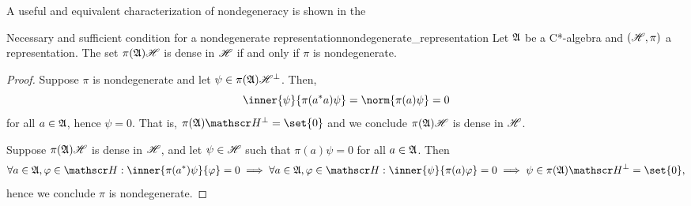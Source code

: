 A useful and equivalent characterization of nondegeneracy is shown in the
\begin{lemma}{Necessary and sufficient condition for a nondegenerate representation}{nondegenerate_representation}
    Let \(\mathfrak{A}\) be a C*-algebra and \((\mathscr{H}, \pi)\) a representation. The set \(\pi(\mathfrak{A})\mathscr{H}\) is dense in \(\mathscr{H}\) if and only if \(\pi\) is nondegenerate.
\end{lemma}
\begin{proof}
    Suppose \(\pi\) is nondegenerate and let \(\psi \in \pi(\mathfrak{A})\mathscr{H}^\perp\). Then,
    \begin{equation*}
        \inner{\psi}{\pi(a^*a)\psi} = \norm{\pi(a)\psi} = 0
    \end{equation*}
    for all \(a \in \mathfrak{A}\), hence \(\psi = 0.\) That is, \(\pi(\algebra{A})\hilbert^{\perp}= \set{0}\) and we conclude \(\pi(\mathfrak{A})\mathscr{H}\) is dense in \(\mathscr{H}\).
    
    Suppose \(\pi(\mathfrak{A})\mathscr{H}\) is dense in \(\mathscr{H}\), and let \(\psi \in \mathscr{H}\) such that \(\pi(a)\psi = 0\) for all \(a \in \mathfrak{A}\). Then
    \begin{equation*}
        \forall a \in \algebra{A}, \varphi \in \hilbert : \inner{\pi(a^*)\psi}{\varphi} = 0 \implies \forall a \in \algebra{A}, \varphi \in \hilbert: \inner{\psi}{\pi(a)\varphi} = 0 \implies \psi \in \pi(\algebra{A})\hilbert^{\perp} = \set{0},
    \end{equation*}
    hence we conclude \(\pi\) is nondegenerate.
\end{proof}

